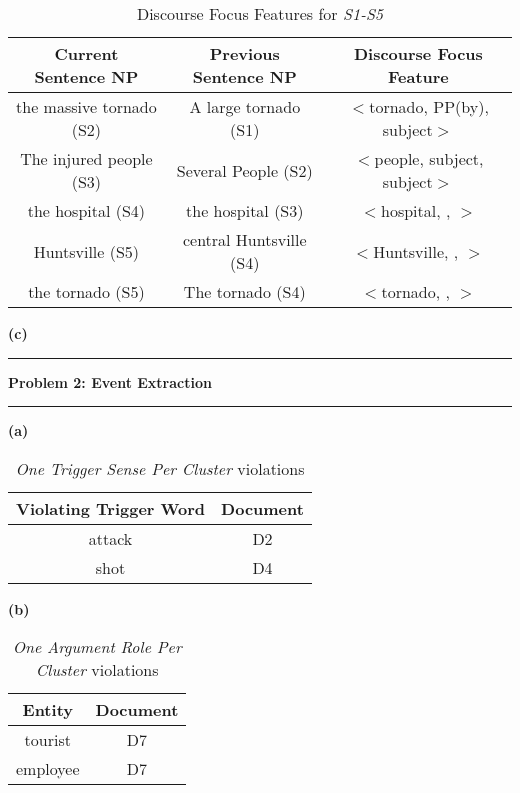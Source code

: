 \documentclass[11pt]{article}
\newcommand\question[2]{\vspace{.25in}\hrule\textbf{#1: #2}\vspace{.5em}\hrule\vspace{.10in}}
\renewcommand\part[1]{\vspace{.10in}\textbf{(#1)}}
\begin{document}
 \begin{table}[H]
\centering
{\renewcommand{\arraystretch}{1.2}%
\begin{tabular}{| c | c | c |}
\hline
\textbf{Current Sentence NP} & \textbf{Previous Sentence NP} & \textbf{Discourse Focus Feature}\\
\hline
the massive tornado (S2)&  A large tornado (S1)& $<$tornado, PP(by), subject$>$ \\ \hline
The injured people (S3)&  Several People (S2)& $<$people, subject, subject$>$ \\ \hline
the hospital (S4)&  the hospital (S3)& $<$hospital, , $>$ \\ \hline
Huntsville (S5)&  central Huntsville (S4)& $<$Huntsville, , $>$ \\ \hline
the tornado (S5)&  The tornado (S4)& $<$tornado, , $>$ \\ \hline
\end{tabular}}
\caption{Discourse Focus Features for \textit{S1-S5}}
\end{table}

\part{c}

\question{Problem 2}{Event Extraction}

\part{a}

 \begin{table}[H]
\centering
{\renewcommand{\arraystretch}{1.2}%
\begin{tabular}{| c | c |}
\hline
\textbf{Violating Trigger Word} & \textbf{Document}\\
\hline
attack & D2 \\ \hline
shot & D4 \\ \hline
\end{tabular}}
\caption{\textit{One Trigger Sense Per Cluster} violations}
\end{table}

\part{b}

 \begin{table}[H]
\centering
{\renewcommand{\arraystretch}{1.2}%
\begin{tabular}{| c | c |}
\hline
\textbf{Entity} & \textbf{Document}\\
\hline
tourist & D7 \\ \hline
employee & D7 \\ \hline
\end{tabular}}
\caption{\textit{One Argument Role Per Cluster} violations}
\end{table}
\end{document}
